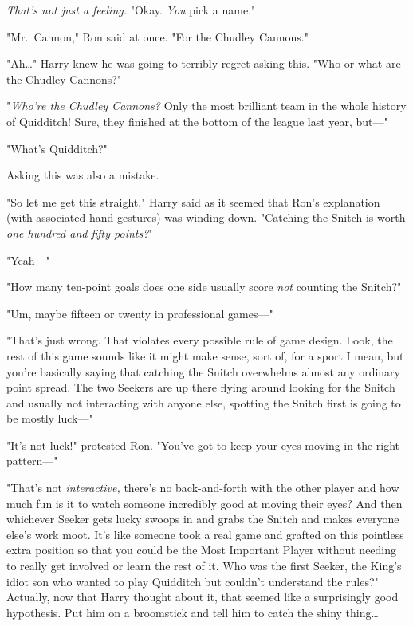 \emph{That's not just a feeling.} "Okay. \emph{You} pick a name."

"Mr.~Cannon," Ron said at once. "For the Chudley Cannons."

"Ah{\ldots}" Harry knew he was going to terribly regret asking this. "Who or 
what are the Chudley Cannons?"

"\emph{Who're the Chudley Cannons?} Only the most brilliant team in the whole 
history of Quidditch! Sure, they finished at the bottom of the league last 
year, but---"

"What's Quidditch?"

Asking this was also a mistake.

"So let me get this straight," Harry said as it seemed that Ron's explanation 
(with associated hand gestures) was winding down. "Catching the Snitch is worth 
\emph{one hundred and fifty points?}"

"Yeah---"

"How many ten-point goals does one side usually score \emph{not} counting the 
Snitch?"

"Um, maybe fifteen or twenty in professional games---"

"That's just wrong. That violates every possible rule of game design. Look, the 
rest of this game sounds like it might make sense, sort of, for a sport I mean, 
but you're basically saying that catching the Snitch overwhelms almost any 
ordinary point spread. The two Seekers are up there flying around looking for 
the Snitch and usually not interacting with anyone else, spotting the Snitch 
first is going to be mostly luck---"

"It's not luck!" protested Ron. "You've got to keep your eyes moving in the 
right pattern---"

"That's not \emph{interactive,} there's no back-and-forth with the other player 
and how much fun is it to watch someone incredibly good at moving their eyes? 
And then whichever Seeker gets lucky swoops in and grabs the Snitch and makes 
everyone else's work moot. It's like someone took a real game and grafted on 
this pointless extra position so that you could be the Most Important Player 
without needing to really get involved or learn the rest of it. Who was the 
first Seeker, the King's idiot son who wanted to play Quidditch but couldn't 
understand the rules?" Actually, now that Harry thought about it, that seemed 
like a surprisingly good hypothesis. Put him on a broomstick and tell him to 
catch the shiny thing{\ldots}

